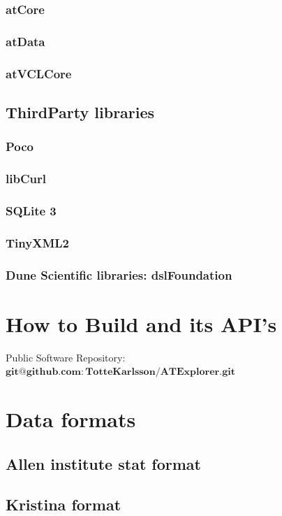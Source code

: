 \documentclass[11pt,fleqn]{book} %
\begin{document}
\begin{appendices}
\subsection{atCore}
\subsection{atData}
\subsection{atVCLCore}

\section{ThirdParty libraries}
\subsection{Poco}
\subsection{libCurl}
\subsection{SQLite 3}
\subsection{TinyXML2}
\subsection{Dune Scientific libraries: dslFoundation}

\chapter{How to Build \ate  and its API's}

Public Software Repository: $\mathbf{git@github.com:TotteKarlsson/ATExplorer.git}$

\chapter{Data formats}
\section{Allen institute stat format}

\section {Kristina format}



\end{appendices}
\end{document}
